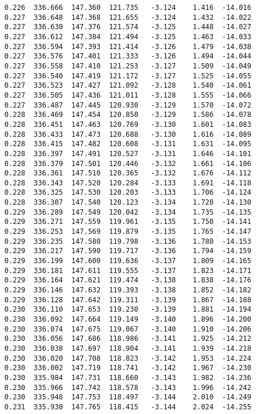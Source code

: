 \begin{verbatim}
   0.226  336.666  147.360  121.735   -3.124    1.416  -14.016
   0.227  336.648  147.368  121.655   -3.124    1.432  -14.022
   0.227  336.630  147.376  121.574   -3.125    1.448  -14.027
   0.227  336.612  147.384  121.494   -3.125    1.463  -14.033
   0.227  336.594  147.393  121.414   -3.126    1.479  -14.038
   0.227  336.576  147.401  121.333   -3.126    1.494  -14.044
   0.227  336.558  147.410  121.253   -3.127    1.509  -14.049
   0.227  336.540  147.419  121.172   -3.127    1.525  -14.055
   0.227  336.523  147.427  121.092   -3.128    1.540  -14.061
   0.227  336.505  147.436  121.011   -3.128    1.555  -14.066
   0.227  336.487  147.445  120.930   -3.129    1.570  -14.072
   0.228  336.469  147.454  120.850   -3.129    1.586  -14.078
   0.228  336.451  147.463  120.769   -3.130    1.601  -14.083
   0.228  336.433  147.473  120.688   -3.130    1.616  -14.089
   0.228  336.415  147.482  120.608   -3.131    1.631  -14.095
   0.228  336.397  147.491  120.527   -3.131    1.646  -14.101
   0.228  336.379  147.501  120.446   -3.132    1.661  -14.106
   0.228  336.361  147.510  120.365   -3.132    1.676  -14.112
   0.228  336.343  147.520  120.284   -3.133    1.691  -14.118
   0.228  336.325  147.530  120.203   -3.133    1.706  -14.124
   0.228  336.307  147.540  120.123   -3.134    1.720  -14.130
   0.229  336.289  147.549  120.042   -3.134    1.735  -14.135
   0.229  336.271  147.559  119.961   -3.135    1.750  -14.141
   0.229  336.253  147.569  119.879   -3.135    1.765  -14.147
   0.229  336.235  147.580  119.798   -3.136    1.780  -14.153
   0.229  336.217  147.590  119.717   -3.136    1.794  -14.159
   0.229  336.199  147.600  119.636   -3.137    1.809  -14.165
   0.229  336.181  147.611  119.555   -3.137    1.823  -14.171
   0.229  336.164  147.621  119.474   -3.138    1.838  -14.176
   0.229  336.146  147.632  119.393   -3.138    1.852  -14.182
   0.229  336.128  147.642  119.311   -3.139    1.867  -14.188
   0.230  336.110  147.653  119.230   -3.139    1.881  -14.194
   0.230  336.092  147.664  119.149   -3.140    1.896  -14.200
   0.230  336.074  147.675  119.067   -3.140    1.910  -14.206
   0.230  336.056  147.686  118.986   -3.141    1.925  -14.212
   0.230  336.038  147.697  118.904   -3.141    1.939  -14.218
   0.230  336.020  147.708  118.823   -3.142    1.953  -14.224
   0.230  336.002  147.719  118.741   -3.142    1.967  -14.230
   0.230  335.984  147.731  118.660   -3.143    1.982  -14.236
   0.230  335.966  147.742  118.578   -3.143    1.996  -14.242
   0.230  335.948  147.753  118.497   -3.144    2.010  -14.249
   0.231  335.930  147.765  118.415   -3.144    2.024  -14.255

\end{verbatim}
